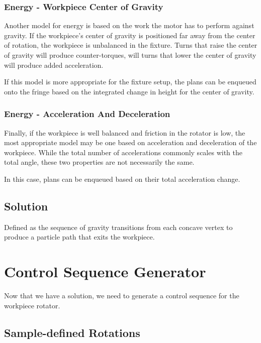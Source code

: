 		\subsubsection{Energy - Workpiece Center of Gravity}

Another model for energy is based on the work the motor has to perform against gravity. If the workpiece's center of gravity is positioned far away from the center of rotation, the workpiece is unbalanced in the fixture. Turns that raise the center of gravity will produce counter-torques, will turns that lower the center of gravity will produce added acceleration.


If this model is more appropriate for the fixture setup, the plans can be enqueued onto the fringe based on the integrated change in height for the center of gravity.

		\subsubsection{Energy - Acceleration And Deceleration}

Finally, if the workpiece is well balanced and friction in the rotator is low, the most appropriate model may be one based on acceleration and deceleration of the workpiece. While the total number of accelerations commonly scales with the total angle, these two properties are not necessarily the same.

In this case, plans can be enqueued based on their total acceleration change.


	\subsection{Solution}

		Defined as the sequence of gravity transitions from each concave vertex to produce a particle path that exits the workpiece.

\section{Control Sequence Generator}

Now that we have a solution, we need to generate a control sequence for the workpiece rotator.

	\subsection{Sample-defined Rotations}

